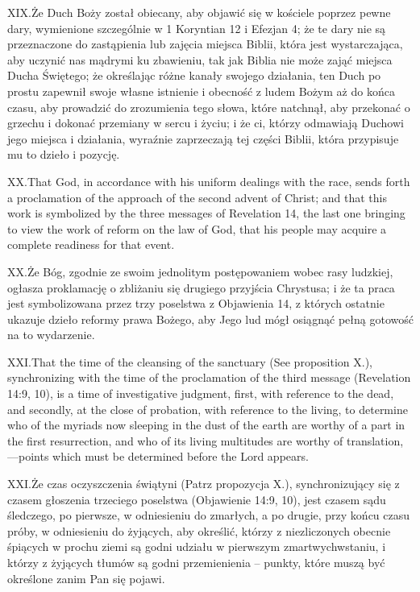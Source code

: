 \lettrine{XIX.} Że Duch Boży został obiecany, aby objawić się w kościele poprzez pewne dary, wymienione szczególnie w 1 Koryntian 12 i Efezjan 4; że te dary nie są przeznaczone do zastąpienia lub zajęcia miejsca Biblii, która jest wystarczająca, aby uczynić nas mądrymi ku zbawieniu, tak jak Biblia nie może zająć miejsca Ducha Świętego; że określając różne kanały swojego działania, ten Duch po prostu zapewnił swoje własne istnienie i obecność z ludem Bożym aż do końca czasu, aby prowadzić do zrozumienia tego słowa, które natchnął, aby przekonać o grzechu i dokonać przemiany w sercu i życiu; i że ci, którzy odmawiają Duchowi jego miejsca i działania, wyraźnie zaprzeczają tej części Biblii, która przypisuje mu to dzieło i pozycję.


\lettrine{XX.} That God, in accordance with his uniform dealings with the race, sends forth a proclamation of the approach of the second advent of Christ; and that this work is symbolized by the three messages of Revelation 14, the last one bringing to view the work of reform on the law of God, that his people may acquire a complete readiness for that event.


\lettrine{XX.} Że Bóg, zgodnie ze swoim jednolitym postępowaniem wobec rasy ludzkiej, ogłasza proklamację o zbliżaniu się drugiego przyjścia Chrystusa; i że ta praca jest symbolizowana przez trzy poselstwa z Objawienia 14, z których ostatnie ukazuje dzieło reformy prawa Bożego, aby Jego lud mógł osiągnąć pełną gotowość na to wydarzenie.


\lettrine{XXI.} That the time of the cleansing of the sanctuary (See proposition X.), synchronizing with the time of the proclamation of the third message (Revelation 14:9, 10), is a time of investigative judgment, first, with reference to the dead, and secondly, at the close of probation, with reference to the living, to determine who of the myriads now sleeping in the dust of the earth are worthy of a part in the first resurrection, and who of its living multitudes are worthy of translation,—points which must be determined before the Lord appears.


\lettrine{XXI.} Że czas oczyszczenia świątyni (Patrz propozycja X.), synchronizujący się z czasem głoszenia trzeciego poselstwa (Objawienie 14:9, 10), jest czasem sądu śledczego, po pierwsze, w odniesieniu do zmarłych, a po drugie, przy końcu czasu próby, w odniesieniu do żyjących, aby określić, którzy z niezliczonych obecnie śpiących w prochu ziemi są godni udziału w pierwszym zmartwychwstaniu, i którzy z żyjących tłumów są godni przemienienia – punkty, które muszą być określone zanim Pan się pojawi.


